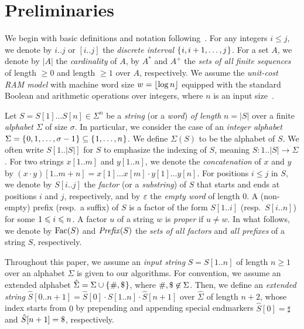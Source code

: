 \section{Preliminaries}
\label{sec:prelim}

We begin with basic definitions and notation following~\cite{charalampopoulos2018extended,barton2014linear,ilie2011minimum,belazzougui2015space:unusual}.
For any integers $i\le j$, we denote by $i..j$ or $[i..j]$ the \textit{discrete interval} $\set{i, i+1, \dots, j}$. For a set $A$, we denote by $|A|$ the \textit{cardinality} of $A$, by $A^*$ and $A^+$ the \textit{sets of all finite sequences} of length $\ge 0$ and length $\ge 1$ over $A$, respectively.
We assume the \textit{unit-cost RAM model} with machine word size $w = \floor{\log n}$ equipped with the standard Boolean and arithmetic operations over integers, where $n$ is an input size~\cite{cormen2009introduction}.

Let $S = S[1]\dots S[n] \in \Sigma^n$ be a \textit{string} (or a \textit{word}) \textit{of length} $n = |S|$ over a finite \textit{alphabet} $\Sigma$ of size $\sigma$. In particular, we consider the case of an \textit{integer alphabet} $\Sigma = \set{0,1,\dots, \sigma - 1} \subseteq \set{1, \dots, n}$. We define $\Sigma(S)$ to be the alphabet of $S$. 
We often write $S[1..|S|]$ for $S$ to emphasize the indexing of $S$, meaning $S: 1..|S| \to \Sigma$. 
For two strings $x[1..m]$ and $y[1..n]$, we denote the \textit{concatenation} of $x$ and $y$ by $(x\cdot y)[1..m+n] = x[1]\dots x[m]\cdot y[1]\dots y[n]$.
For positions $i\le j$ in $S$, we denote by $S[i..j]$ the \textit{factor} (or a \textit{substring}) of $S$ that starts and ends at positions $i$ and $j$, respectively, and by $\eps$ the \textit{empty word} of length $0$. A (non-empty) prefix (resp.~a suffix) of $S$ is a factor of the form $S[1..i]$ (resp.~$S[i..n]$) for some $\btw i1n$. A factor $u$ of a string $w$ is \textit{proper} if $u\not= w$. In what follows, we denote by $\Fac(S)$ and $\Pref(S)$ the \textit{sets of all factors} and \textit{all prefixes} of a string $S$, respectively. 

Throughout this paper, we assume an \textit{input string} $S = S[1..n]$ of length $n\ge 1$ over an alphabet $\Sigma$ is given to our algorithms. For convention, we assume an extended alphabet $\hat\Sigma = \Sigma\cup\set{\sharp, \daller}$, where $\#, \daller \not \in \Sigma$. Then, we define an \textit{extended string} $\hat S[0..n+1] = \hat S[0]\cdot S[1..n]\cdot \hat S[n+1]$  over $\hat \Sigma$ of length $n+2$, whose index starts from $0$ by prepending and appending special endmarkers $\hat S[0] = \sharp$ and $\hat S[n+1] = \daller$, respectively. 

